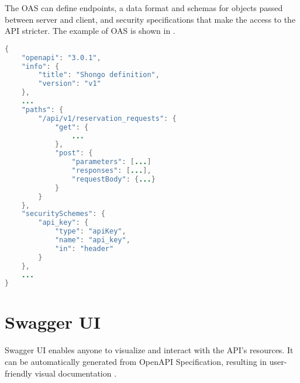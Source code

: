 The OAS can define endpoints, a data format and schemas for objects passed between server and client, and security specifications that make the access to the API stricter.
The example of OAS is shown in .
\begin{lstlisting}[language=Java, caption=OpenAPI.json, label=lst:openapi]
{
    "openapi": "3.0.1",
    "info": {
        "title": "Shongo definition",
        "version": "v1"
    },
    ...
    "paths": {
        "/api/v1/reservation_requests": {
            "get": {
                ...
            },
            "post": {
                "parameters": [...]
                "responses": [...],
                "requestBody": {...}
            }
        }
    },
    "securitySchemes": {
        "api_key": {
            "type": "apiKey",
            "name": "api_key",
            "in": "header"
        }
    },
    ...
}
\end{lstlisting}

\section{Swagger UI} \label{sec:swagger}
Swagger UI enables anyone to visualize and interact with the API’s resources. It can be automatically generated from OpenAPI Specification, resulting in user-friendly visual documentation \cite{swagger}.
